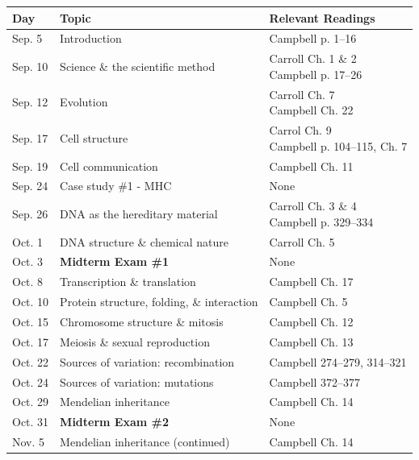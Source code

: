 \documentclass[hidelinks]{article}
\begin{document}
	\begin{table}[H]
		\footnotesize
		\centering
		\begin{tabular}{l p{6cm} p{6cm}}
			\toprule
			\textbf{Day} & \textbf{Topic} & \textbf{Relevant Readings}\\
			\midrule
			Sep. 5 & Introduction & Campbell p. 1--16\\
			\addlinespace
			Sep. 10 & Science \& the scientific method & \makecell[tl]{Carroll Ch. 1 \& 2\\ Campbell p. 17--26}\\
			\addlinespace
			Sep. 12 & Evolution & \makecell[tl]{Carroll Ch. 7\\ Campbell Ch. 22}\\
			\addlinespace
			Sep. 17 & Cell structure & \makecell[tl]{Carrol Ch. 9\\ Campbell p. 104--115, Ch. 7}\\
			\addlinespace
			Sep. 19 & Cell communication & Campbell Ch. 11\\
			\addlinespace
			Sep. 24 & Case study \#1 - MHC & None\\
			\addlinespace
			Sep. 26 & DNA as the hereditary material & \makecell[tl]{Carroll Ch. 3 \& 4\\ Campbell p. 329--334}\\
			\addlinespace
			Oct. 1 & DNA structure \& chemical nature & Carroll Ch. 5\\
			\addlinespace
			Oct. 3 & \textbf{Midterm Exam \#1} & None \\
			\addlinespace
			Oct. 8 & Transcription \& translation & Campbell Ch. 17\\
			\addlinespace
			Oct. 10 & Protein structure, folding, \& interaction & Campbell Ch. 5\\
			\addlinespace
			Oct. 15 & Chromosome structure \& mitosis & Campbell Ch. 12\\
			\addlinespace
			Oct. 17 & Meiosis \& sexual reproduction & Campbell Ch. 13\\
			\addlinespace
			Oct. 22 & Sources of variation: recombination & Campbell 274--279, 314--321\\
			\addlinespace
			Oct. 24 & Sources of variation: mutations & Campbell 372--377\\
			\addlinespace
			Oct. 29 & Mendelian inheritance & Campbell Ch. 14\\
			\addlinespace
			Oct. 31 & \textbf{Midterm Exam \#2} & None\\
			\addlinespace
			Nov. 5 & Mendelian inheritance (continued) & Campbell Ch. 14\\

\end{tabular}
\end{table}
\end{document}
